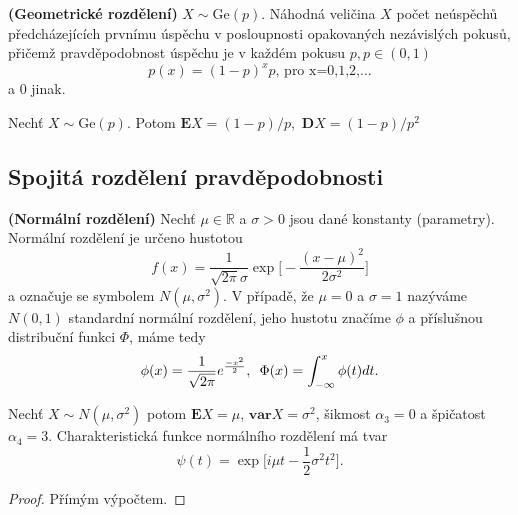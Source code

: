 \begin{definition}{\textbf{(Geometrické rozdělení)}}
$X\sim \mathrm{Ge}(p)$. Náhodná veličina $X$ počet neúspěchů předcházejících prvnímu úspěchu v posloupnosti opakovaných nezávislých pokusů, přičemž pravděpodobnost úspěchu je v každém pokusu $p, p\in (0,1)$
\begin{equation}
p(x)=(1-p)^xp \text{,    pro x=0,1,2,\ldots}
\end{equation}
 a $0$ jinak.
\end{definition}

\begin{proposition}
Nechť $X \sim \mathrm{Ge}(p)$. Potom $\mathbf{E}X =(1-p)/p,$ $\mathbf{D}X = (1-p)/p^2$ 
\end{proposition}




\subsection{Spojitá rozdělení pravděpodobnosti}
\begin{definition}{\textbf{(Normální rozdělení)}}
Nechť $ \mu \in \mathbb{R}$ a $\sigma > 0$ jsou dané konstanty (parametry). Normální rozdělení je určeno hustotou
\begin{equation}
f(x) = \frac{1}{\sqrt{2\pi}\sigma}\exp \bigg[ -\frac{(x - \mu)^{2}}{2\sigma^{2}} \bigg]
\end{equation}
a označuje se symbolem $N(\mu, \sigma^{2}).$ V případě, že $\mu = 0$ a $\sigma = 1$ nazýváme $N(0, 1)$ standardní normální rozdělení, jeho hustotu značíme $\phi$ a příslušnou distribuční funkci $\Phi$, máme tedy
\begin{equation}
\phi(x) = \frac{1}{\sqrt{2\pi}}e^{\frac{-x^{2}}{2}}, \enskip \Phi(x) = \int_{-\infty}^{x}\phi(t)dt.
\end{equation}
\end{definition}

\begin{proposition}
Nechť $X \sim N(\mu, \sigma^{2})$ potom $\mathbf{E}X = \mu$, $\mathbf{var}X = \sigma^{2}$, šikmost $\alpha_{3} = 0$ a špičatost $\alpha_{4} = 3$. Charakteristická funkce normálního rozdělení má tvar 
\begin{equation}
\psi(t) = \exp\bigg[ i\mu t - \frac{1}{2}\sigma^{2}t^{2} \bigg].
\end{equation}
\end{proposition}
\begin{proof}
Přímým výpočtem.
\end{proof}

